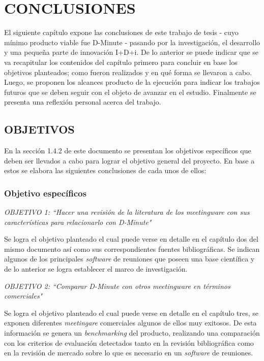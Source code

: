 \section{CONCLUSIONES}

El siguiente capítulo expone las conclusiones de este trabajo de tesis - cuyo mínimo producto viable fue D-Minute - pasando por la investigación, el desarrollo y una pequeña parte de innovación I+D+i. De lo anterior se puede indicar que se va recapitular los contenidos del capítulo primero para concluir en base los objetivos planteados; como fueron realizados y en qué forma se llevaron a cabo. Luego, se proponen los alcances producto de la ejecución para indicar los trabajos futuros que se deben seguir con el objeto de avanzar en el estudio. Finalmente se presenta una reflexión personal acerca del trabajo.


\subsection{OBJETIVOS}

En la sección 1.4.2 de este documento se presentan los objetivos específicos que deben ser llevados a cabo para lograr el objetivo general del proyecto. En base a estos se elabora las siguientes conclusiones de cada unos de ellos:

\subsubsection{Objetivo específicos}

\textit{OBJETIVO 1:  “Hacer una revisión de la literatura de los \textit{meetingware} con sus características para relacionarlo con D-Minute"}\newline

Se logra el objetivo planteado el cual puede verse en detalle en el capítulo dos del mismo documento así como sus correspondientes fuentes bibliográficas. Se indican algunos de los principales \textit{software} de reuniones que poseen una base científica y de lo anterior se logra establecer el marco de investigación.\newline

\textit{OBJETIVO 2:  “Comparar D-Minute con otros \textit{meetingware} en términos comerciales"}\newline

Se logra el objetivo planteado el cual puede verse en detalle en el capítulo tres, se exponen diferentes \textit{meetingare} comerciales algunos de ellos muy exitosos. De esta información se genera un \textit{benchmarking} del producto, realizando una comparación con los criterios de evaluación detectados tanto en la revisión bibliográfica como en la revisión de mercado sobre lo que es necesario en un \textit{software} de reuniones.\newline

